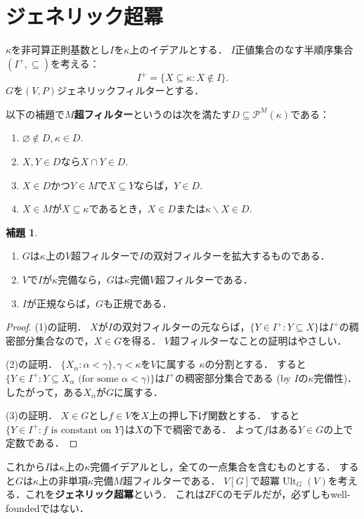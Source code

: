 \documentclass[uplatex]{jsarticle}
\newcommand{\Pow}{\mathcal{P}}
\newcommand{\ZFC}{\mathsf{ZFC}}
\newcommand{\Ult}{\operatorname{Ult}}
\renewcommand\emptyset{\varnothing}
\renewcommand\subset{\subseteq}
\renewcommand{\setminus}{\smallsetminus}
\theoremstyle{definition}
\newtheorem{lem}[thm]{補題}
\begin{document}
	\section{ジェネリック超冪}
	
	$\kappa$を非可算正則基数とし$I$を$\kappa$上のイデアルとする．
	$I$正値集合のなす半順序集合$(I^+, \subset)$を考える：
	\[
	I^+ = \{ X \subset \kappa : X \not \in I \}.
	\]
	$G$を$(V, P)$ジェネリックフィルターとする．
	
	以下の補題で\textbf{$M$超フィルター}というのは次を満たす$D \subset \Pow^M(\kappa)$である：
	\begin{enumerate}
		\item $\emptyset \not \in D, \kappa \in D$.
		\item $X, Y \in D$なら$X \cap Y \in D$.
		\item $X \in D$かつ$Y \in M$で$X \subset Y$ならば，$Y \in D$.
		\item $X \in M$が$X \subset \kappa$であるとき，$X \in D$または$\kappa \setminus X \in D$.
	\end{enumerate}
	
	\begin{lem}
		\begin{enumerate}
			\item $G$は$\kappa$上の$V$超フィルターで$I$の双対フィルターを拡大するものである．
			\item $V$で$I$が$\kappa$完備なら，$G$は$\kappa$完備$V$超フィルターである．
			\item $I$が正規ならば，$G$も正規である．
		\end{enumerate}
	\end{lem}
	\begin{proof}
		(1)の証明．
		$X$が$I$の双対フィルターの元ならば，$\{ Y \in I^+ : Y \subset X \}$は$I^+$の稠密部分集合なので，$X \in G$を得る．
		$V$超フィルターなことの証明はやさしい．
		
		(2)の証明．
		$\{ X_\alpha : \alpha < \gamma \}, \gamma < \kappa$を$V$に属する $\kappa$の分割とする．
		すると$\{ Y \in I^+ : Y \subset X_\alpha \text{ (for some $\alpha < \gamma$)}\}$は$I^+$の稠密部分集合である (by $I$の$\kappa$完備性)．したがって，ある$X_\alpha$が$G$に属する．
		
		(3)の証明．
		$X \in G$とし$f \in V$を$X$上の押し下げ関数とする．
		すると$\{ Y \in I^+ : \text{$f$ is constant on $Y$} \}$は$X$の下で稠密である．
		よって$f$はある$Y \in G$の上で定数である．
	\end{proof}

	これから$I$は$\kappa$上の$\kappa$完備イデアルとし，全ての一点集合を含むものとする．
	すると$G$は$\kappa$上の非単項$\kappa$完備$M$超フィルターである．
	$V[G]$で超冪$\Ult_G(V)$を考える．これを\textbf{ジェネリック超冪}という．
	これは$\ZFC$のモデルだが，必ずしもwell-foundedではない．
	
\end{document}

